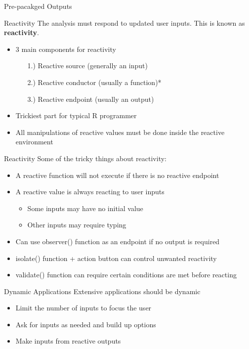 \documentclass{beamer}\usepackage[]{graphicx}\usepackage[]{color}
\begin{document}
\begin{frame}{Pre-pacakged Outputs}

\end{frame}

\begin{frame}{Reactivity}
The analysis must respond to updated user inputs.  This is known as \textbf{reactivity}.
\begin{itemize}
\bigskip
\item 3 main components for reactivity
  \begin{itemize}
  \item[1.)] Reactive source (generally an input)
  \item[2.)] Reactive conductor (usually a function)*
  \item[3.)] Reactive endpoint (usually an output)
  \end{itemize}
  \bigskip
\item Trickiest part for typical R programmer
\bigskip
\item All manipulations of reactive values must be done inside the reactive environment
\end{itemize}
\end{frame}

\begin{frame}{Reactivity}
Some of the tricky things about reactivity:
\begin{itemize}
\item A reactive function will not execute if there is no reactive endpoint
\pause
\bigskip
\item A reactive value is always reacting to user inputs
  \begin{itemize}
  \smallskip
  \item Some inputs may have no initial value
  \smallskip
  \item Other inputs may require typing
  \end{itemize}
\pause
\bigskip
\item Can use observer() function as an endpoint if no output is required
\pause
\bigskip
\item isolate() function + action button can control unwanted reactivity
\bigskip
\pause
\item validate() function can require certain conditions are met before reacting
\end{itemize}
\end{frame}


\begin{frame}{Dynamic Applications}
Extensive applications should be dynamic
\bigskip
\begin{itemize}
\item Limit the number of inputs to focus the user
\pause
\bigskip
\item Ask for inputs as needed and build up options
\pause
\bigskip
\item Make inputs from reactive outputs
\end{itemize}
\end{frame}
\end{document}
